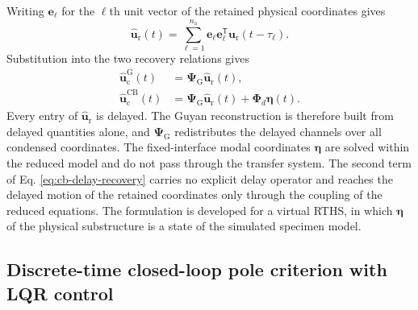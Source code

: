 \documentclass[a4paper,fleqn,review,12pt]{cas-sc}
\numberwithin{equation}{section}
\begin{document}
Writing \(\bm{e}_{\ell}\) for the \(\ell\)th unit vector of the retained physical coordinates gives
\begin{equation}
  \hat{\bm{u}}_{\mathrm{r}}(t)
  =\sum_{\ell=1}^{n_{\mathrm{a}}}
  \bm{e}_{\ell}\bm{e}_{\ell}^{\mathsf{T}}
  \bm{u}_{\mathrm{r}}(t-\tau_{\ell}).
  \label{eq:retained-delay-vector}
\end{equation}
Substitution into the two recovery relations gives
\begin{subequations}
  \label{eq:delay-recovery}
  \begin{align}
    \hat{\bm{u}}_{\mathrm{c}}^{\mathrm{G}}(t)
    &=\bm{\Psi}_{\mathrm{G}}\hat{\bm{u}}_{\mathrm{r}}(t),
    \label{eq:guyan-delay-recovery}\\
    \hat{\bm{u}}_{\mathrm{c}}^{\mathrm{CB}}(t)
    &=\bm{\Psi}_{\mathrm{G}}\hat{\bm{u}}_{\mathrm{r}}(t)
    +\bm{\Phi}_{d}\bm{\eta}(t).
    \label{eq:cb-delay-recovery}
  \end{align}
\end{subequations}
Every entry of \(\hat{\bm{u}}_{\mathrm{r}}\) is delayed. The Guyan reconstruction is therefore built from delayed quantities alone, and \(\bm{\Psi}_{\mathrm{G}}\) redistributes the delayed channels over all condensed coordinates. The fixed-interface modal coordinates \(\bm{\eta}\) are solved within the reduced model and do not pass through the transfer system. The second term of Eq. \eqref{eq:cb-delay-recovery} carries no explicit delay operator and reaches the delayed motion of the retained coordinates only through the coupling of the reduced equations. The formulation is developed for a virtual RTHS, in which \(\bm{\eta}\) of the physical substructure is a state of the simulated specimen model.

\subsection{Discrete-time closed-loop pole criterion with LQR control}
\label{sec:pole-criterion}
\end{document}
